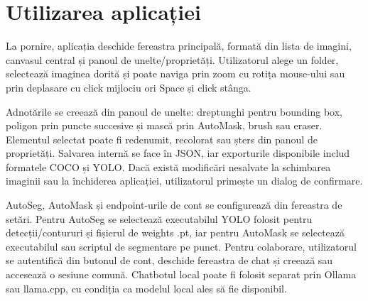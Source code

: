 \section{Utilizarea aplicației}

La pornire, aplicația deschide fereastra principală, formată din lista de imagini, canvasul central și panoul de unelte/proprietăți. Utilizatorul alege un folder, selectează imaginea dorită și poate naviga prin zoom cu rotița mouse-ului sau prin deplasare cu click mijlociu ori Space și click stânga.

Adnotările se creează din panoul de unelte: dreptunghi pentru bounding box, poligon prin puncte succesive și mască prin AutoMask, brush sau eraser. Elementul selectat poate fi redenumit, recolorat sau șters din panoul de proprietăți. Salvarea internă se face în JSON, iar exporturile disponibile includ formatele COCO și YOLO. Dacă există modificări nesalvate la schimbarea imaginii sau la închiderea aplicației, utilizatorul primește un dialog de confirmare.

AutoSeg, AutoMask și endpoint-urile de cont se configurează din fereastra de setări. Pentru AutoSeg se selectează executabilul YOLO folosit pentru detecții/contururi și fișierul de weights .pt, iar pentru AutoMask se selectează executabilul sau scriptul de segmentare pe punct. Pentru colaborare, utilizatorul se autentifică din butonul de cont, deschide fereastra de chat și creează sau accesează o sesiune comună. Chatbotul local poate fi folosit separat prin Ollama sau llama.cpp, cu condiția ca modelul local ales să fie disponibil.
